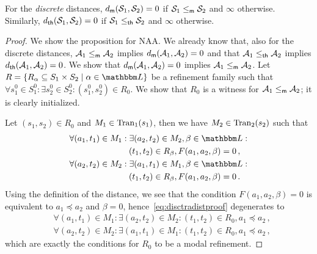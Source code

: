 \documentclass[twocolumn]{svjour3-dummy}
\newcommand*\labpre{\preccurlyeq}
\newcommand*\NAA{NAA\xspace}
\newcommand*\mr{\le_\textup{\textsf{m}}}
\newcommand*\tr{\le_\textup{\textsf{th}}}
\newcommand*\cA{\mathcal A}
\newcommand*\Tran{\textup{\textrm{Tran}}}
\newcommand*\cS{\mathcal S}
\newcommand*\LL{\mathbbm L}
\newcommand*\md{d_\textup{\textsf{m}}} \newcommand*\mdl{\smash{\md^\LL}}
\newcommand*\thd{d_\textup{\textsf{th}}} \newcommand*\thdl{\thd^\LL}
\begin{document}
\begin{proposition}
  \label{pr:dist-prop.disc}
  For the \emph{discrete} distances, $\md( \cS_1, \cS_2)= 0$ if
  $\cS_1\mr \cS_2$ and $\infty$ otherwise.  Similarly, $\thd( \cS_1,
  \cS_2)= 0$ if $\cS_1\tr \cS_2$ and $\infty$ otherwise.
\end{proposition}

\begin{proof}We show the proposition for \NAA.  We already know that, also for the
  discrete distances, $\cA_1\mr \cA_2$ implies $\md( \cA_1, \cA_2)= 0$
  and that $\cA_1\tr \cA_2$ implies $\thd( \cA_1, \cA_2)= 0$.  We show
  that $\md( \cA_1, \cA_2)= 0$ implies $\cA_1\mr \cA_2$.  Let $R=\{
  R_\alpha\subseteq S_1\times S_2\mid \alpha\in \LL\}$ be a refinement
  family such that $\forall s_1^0\in S_1^0: \exists s_2^0\in S_2^0:(
  s_1^0, s_2^0)\in R_0$.  We show that $R_0$ is a witness for $\cA_1\mr
  \cA_2$; it is clearly initialized.

  Let $( s_1, s_2)\in R_0$ and $M_1\in \Tran_1( s_1)$, then we have
  $M_2\in \Tran_2( s_2)$ such that
  \begin{equation}
    \label{eq:disctradistproof}
    \begin{aligned}
      & \forall( a_1, t_1)\in M_1: \exists( a_2, t_2)\in M_2, \beta\in
      \LL: \\
      &\hspace*{7em} ( t_1, t_2)\in R_\beta, F( a_1, a_2, \beta)= 0\,, \\
      & \forall( a_2, t_2)\in M_2: \exists( a_1, t_1)\in M_1, \beta\in
      \LL: \\
      &\hspace*{7em} ( t_1, t_2)\in R_\beta, F( a_1, a_2, \beta)= 0\,.
    \end{aligned}
  \end{equation}
  Using the definition of the distance, we see that the condition $F(
  a_1, a_2, \beta)= 0$ is equivalent to $a_1\labpre a_2$ and $\beta= 0$,
  hence~\eqref{eq:disctradistproof} degenerates to
  \begin{equation*}
    \begin{aligned}
      & \forall( a_1, t_1)\in M_1: \exists( a_2, t_2)\in M_2:( t_1,
      t_2)\in R_0, a_1\labpre a_2\,, \\
      & \forall( a_2, t_2)\in M_2: \exists( a_1, t_1)\in M_1:( t_1,
      t_2)\in R_0, a_1\labpre a_2\,,
    \end{aligned}
  \end{equation*}
  which are exactly the conditions for $R_0$ to be a modal refinement.


\end{proof}
\end{document}
